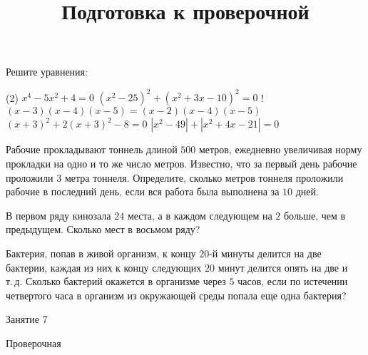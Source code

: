 \begin{homework}[number=3]
	\begin{listofex}
		\item  Решите уравнения:
		\begin{tasks}(2)
			\task \( x^4-5x^2+4=0 \)
			\task \( (x^2-25)^2+(x^2+3x-10)^2=0 \)
			\task! \( (x-3)(x-4)(x-5)=(x-2)(x-4)(x-5) \)
			\task \( (x+3)^2+2(x+3)^2-8=0 \)
			\task \( |x^2-49|+|x^2+4x-21|=0 \)
		\end{tasks}
		\item Рабочие прокладывают тоннель длиной \( 500 \) метров, ежедневно увеличивая норму прокладки на одно и то же число метров. Известно, что за первый день рабочие проложили \( 3 \) метра тоннеля. Определите, сколько метров тоннеля проложили рабочие в последний день, если вся работа была выполнена за \( 10 \) дней.
		\item В первом ряду кинозала \( 24 \) места, а в каждом следующем на \( 2 \) больше, чем в предыдущем. Сколько мест в восьмом ряду?
		\item Бактерия, попав в живой организм, к концу \( 20 \)-й минуты делится на две бактерии, каждая из них к концу следующих \( 20 \) минут делится опять на две и т. д. Сколько бактерий окажется в организме через \( 5 \) часов, если по истечении четвертого часа в организм из окружающей среды попала еще одна бактерия?
	\end{listofex}
\end{homework}

\begin{class}[number=7]
	\title{Подготовка к проверочной}
	\begin{listofex}
		\item Занятие 7
	\end{listofex}
\end{class}

\begin{exam}
	\begin{listofex}
		\item Проверочная
	\end{listofex}
\end{exam}
